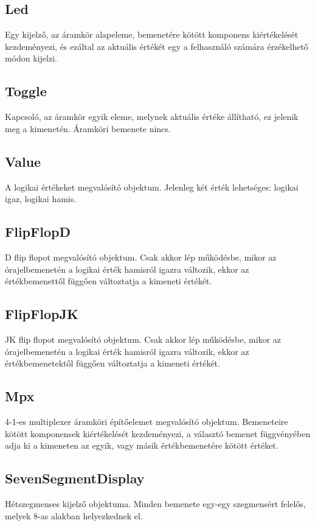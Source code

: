 \subsection{\bf Led}
Egy kijelző, az áramkör alapeleme, bemenetére kötött komponens kiértékelését kezdeményezi, és ezáltal az aktuális értékét egy a felhasználó számára érzékelhető módon kijelzi.

\subsection{\bf Toggle}
Kapcsoló, az áramkör egyik eleme, melynek aktuális értéke állítható, ez jelenik meg a kimenetén. Áramköri bemenete nincs.

\subsection{\bf Value}
A logikai értékeket megvalósító objektum. Jelenleg két érték lehetséges: logikai igaz, logikai hamis.

\subsection{\bf FlipFlopD}
D flip flopot megvalósító objektum. Csak akkor lép működésbe, mikor az órajelbemenetén a logikai érték hamisról igazra változik, ekkor az értékbemenettől függően változtatja a kimeneti értékét.

\subsection{\bf FlipFlopJK}
JK flip flopot megvalósító objektum. Csak akkor lép működésbe, mikor az órajelbemenetén a logikai érték hamisról igazra változik, ekkor az értékbemenetektől függően változtatja a kimeneti értékét.

\subsection{\bf Mpx}
4-1-es multiplexer áramköri építőelemet megvalósító objektum. Bemeneteire kötött komponensek kiértékelését kezdeményezi, a választó bemenet függvényében adja ki a kimeneten az egyik, vagy másik értékbemenetére kötött értéket.

\subsection{\bf SevenSegmentDisplay}
Hétszegmenses kijelző objektuma. Minden bemenete egy-egy szegmensért felelős, melyek 8-as alakban helyezkednek el.

